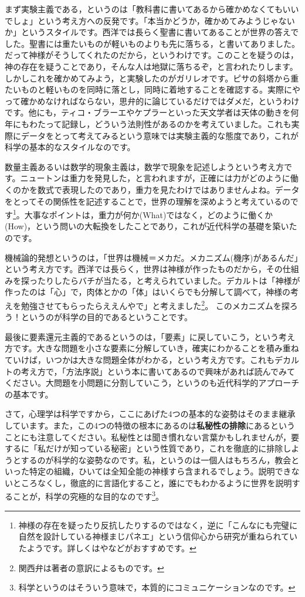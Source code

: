 \documentclass{book}
\makeatletter
\newcommand\keytermL[2]{\textbf{#1}\index{#2@#1}}
\makeatother
\begin{document}
まず実験主義である，というのは「教科書に書いてあるから確かめなくてもいいでしょ」という考え方への反発です。「本当かどうか，確かめてみようじゃないか」というスタイルです。西洋では長らく聖書に書いてあることが世界の答えでした。聖書には重たいものが軽いものよりも先に落ちる，と書いてありました。だって神様がそうしてくれたのだから，というわけです。このことを疑うのは，神の存在を疑うことであり，そんな人は地獄に落ちるぞ，と言われたりします。しかしこれを確かめてみよう，と実験したのがガリレオです。ピサの斜塔から重たいものと軽いものを同時に落とし，同時に着地することを確認する。実際にやって確かめなければならない，思弁的に論じているだけではダメだ，というわけです。他にも，ティコ・ブラーエやケプラーといった天文学者は天体の動きを何年にもわたって記録し，どういう法則性があるのかを考えていました。これも実際にデータをとって考えてみるという意味では実験主義的な態度であり，これが科学の基本的なスタイルなのです。

数量主義あるいは数学的現象主義は，数学で現象を記述しようという考え方です。ニュートンは重力を発見した，と言われますが，正確には力がどのように働くのかを数式で表現したのであり，重力を見たわけではありませんよね。データをとってその関係性を記述することで，世界の理解を深めようと考えているのです\footnote{神様の存在を疑ったり反抗したりするのではなく，逆に「こんなにも完璧に自然を設計している神様まじパネエ」という信仰心から研究が重ねられていたようです。詳しくは\citet{池内了2014}や\citet{蛇蔵2014}などがおすすめです。}。大事なポイントは，重力が何か(What)ではなく，どのように働くか(How)，という問いの大転換をしたことであり，これが近代科学の基礎を築いたのです。

機械論的発想というのは，「世界は機械＝メカだ。メカニズム(機序)があるんだ」という考え方です。西洋では長らく，世界は神様が作ったものだから，その仕組みを探ったりしたらバチが当たる，と考えられていました。デカルトは「神様が作ったのは「心」で，肉体とかの「体」はいくらでも分解して調べて，神様の考えを勉強させてもらったらええんやで」と考えました\footnote{関西弁は著者の意訳によるものです。}。
このメカニズムを探ろう！というのが科学の目的であるということです。

最後に要素還元主義的であるというのは，「要素」に戻していこう，という考え方です。大きな問題を小さな要素に分解していき，確実にわかることを積み重ねていけば，いつかは大きな問題全体がわかる，という考え方です。これもデカルトの考え方で，「方法序説」という本に書いてあるので興味があれば読んでみてください\citep{デカルト1997}。大問題を小問題に分割していこう，というのも近代科学的アプローチの基本です。

さて，心理学は科学ですから，ここにあげた4つの基本的な姿勢はそのまま継承しています。また，この4つの特徴の根本にあるのは\keytermL{私秘性の排除}{しひせいのはいじょ}にあるということにも注意してください。私秘性とは聞き慣れない言葉かもしれませんが，要するに「私だけが知っている秘密」という性質であり，これを徹底的に排除しようとするのが科学的な姿勢なのです。私，というのは一個人はもちろん，教会といった特定の組織，ひいては全知全能の神様すら含まれるでしょう。説明できないところなくし，徹底的に言語化すること，誰にでもわかるように世界を説明することが，科学の究極的な目的なのです\footnote{科学というのはそういう意味で，本質的にコミュニケーションなのです。}。
\end{document}
